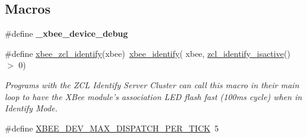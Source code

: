 \subsection*{Macros}
\begin{DoxyCompactItemize}
\item 
\hypertarget{group__xbee__device_ga86812c9b592261c600106f7b9afe26a1}{\#define {\bfseries \-\_\-xbee\-\_\-device\-\_\-debug}}\label{group__xbee__device_ga86812c9b592261c600106f7b9afe26a1}

\item 
\#define \hyperlink{group__xbee__device_gaece12bbe1dd3135e51f714b485ed0cf2}{xbee\-\_\-zcl\-\_\-identify}(xbee)~\hyperlink{group__xbee__device_ga42768d8f8aa841ed4f42396cff2815aa}{xbee\-\_\-identify}( xbee, \hyperlink{group__zcl__identify_ga95b00d55b861c1ea6033c16794ae818d}{zcl\-\_\-identify\-\_\-isactive}() $>$ 0)
\begin{DoxyCompactList}\small\item\em Programs with the Z\-C\-L Identify Server Cluster can call this macro in their main loop to have the X\-Bee module's association L\-E\-D flash fast (100ms cycle) when in Identify Mode. \end{DoxyCompactList}\item 
\hypertarget{group__xbee__device_gaeaab23929fe74420e519d21bba8008e6}{\#define \hyperlink{group__xbee__device_gaeaab23929fe74420e519d21bba8008e6}{X\-B\-E\-E\-\_\-\-D\-E\-V\-\_\-\-M\-A\-X\-\_\-\-D\-I\-S\-P\-A\-T\-C\-H\-\_\-\-P\-E\-R\-\_\-\-T\-I\-C\-K}~5}\label{group__xbee__device_gaeaab23929fe74420e519d21bba8008e6}


\end{DoxyCompactItemize}
